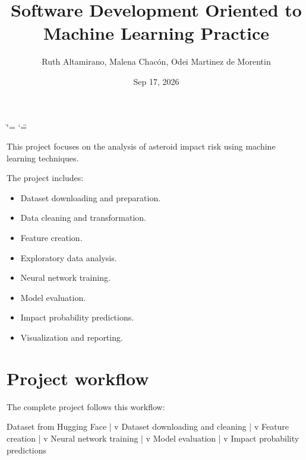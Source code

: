 \documentclass[letterpaper,10pt,english]{sphinxmanual}
\title{Software Development Oriented to Machine Learning Practice}
\date{Sep 17, 2026}
\author{Ruth Altamirano, Malena Chacón, Odei Martinez de Morentin}
\begin{document}
\ifdefined\shorthandoff
  \ifnum\catcode`\=\string=\active\shorthandoff{=}\fi
  \ifnum\catcode`\"=\active{}\fi
\fi

\pagestyle{empty}
\sphinxmaketitle
\pagestyle{plain}
\sphinxtableofcontents
\pagestyle{normal}
\label{\detokenize{index::doc}}


\sphinxAtStartPar
This project focuses on the analysis of asteroid impact risk using machine
learning techniques.

\sphinxAtStartPar
The project includes:
\begin{itemize}
\item {} 
\sphinxAtStartPar
Dataset downloading and preparation.

\item {} 
\sphinxAtStartPar
Data cleaning and transformation.

\item {} 
\sphinxAtStartPar
Feature creation.

\item {} 
\sphinxAtStartPar
Exploratory data analysis.

\item {} 
\sphinxAtStartPar
Neural network training.

\item {} 
\sphinxAtStartPar
Model evaluation.

\item {} 
\sphinxAtStartPar
Impact probability predictions.

\item {} 
\sphinxAtStartPar
Visualization and reporting.

\end{itemize}


\chapter{Project workflow}
\label{\detokenize{index:project-workflow}}
\sphinxAtStartPar
The complete project follows this workflow:

\begin{sphinxVerbatim}[commandchars=\\\{\}]
Dataset from Hugging Face
           |
           v
Dataset downloading and cleaning
           |
           v
Feature creation
           |
           v
Neural network training
           |
           v
Model evaluation
           |
           v
Impact probability predictions
\end{sphinxVerbatim}
\end{document}
